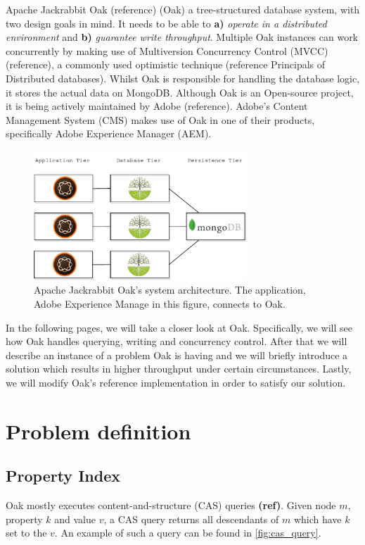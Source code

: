 \documentclass[abstracton,12pt]{scrreprt}
\begin{document}
Apache Jackrabbit Oak (reference) (Oak) a tree-structured database system, with two design goals in mind.
It needs to be able to \textbf{a)} \textit{operate in a distributed environment} and \textbf{b)} \textit{guarantee write throughput}.
Multiple Oak instances can work concurrently by making use of Multiversion Concurrency Control (MVCC) (reference), a commonly used optimistic technique (reference Principals of Distributed databases).
Whilst Oak is responsible for handling the database logic, it stores the actual data on MongoDB.
Although Oak is an Open-source project, it is being actively maintained by Adobe (reference).
Adobe's Content Management System (CMS) makes use of Oak in one of their products, specifically Adobe Experience Manager (AEM).

\begin{figure}[h]
    \centering
    \includegraphics[width=8cm]{architecture}
    \caption{Apache Jackrabbit Oak's system architecture. The application, Adobe Experience Manage in this figure, connects to Oak.}
    \label{fig:architecture}
\end{figure}

In the following pages, we will take a closer look at Oak.
Specifically, we will see how Oak handles querying, writing and concurrency control.
After that we will describe an instance of a problem Oak is having and we will briefly introduce a solution which results in higher throughput under certain circumstances.
Lastly, we will modify Oak's reference implementation in order to satisfy our solution.

\chapter{Problem definition}

\section{Property Index}

Oak mostly executes content-and-structure (CAS) queries \textbf{(ref)}.
Given node $m$, property $k$ and value $v$, a CAS query returns all descendants of $m$ which have $k$ set to the $v$.
An example of such a query can be found in \cref{fig:cas_query}.
\end{document}
